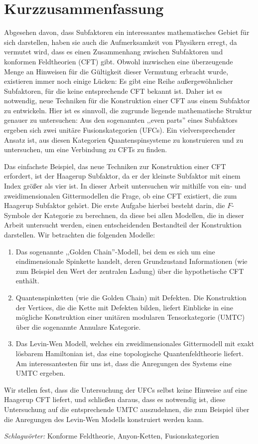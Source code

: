\chapter*{Kurzzusammenfassung}



Abgesehen davon, dass Subfaktoren ein interessantes mathematisches Gebiet für sich darstellen, haben sie auch die Aufmerksamkeit von Physikern erregt, da vermutet wird, dass es einen Zusammenhang zwischen Subfaktoren und konformen Feldtheorien (CFT) gibt. Obwohl inzwischen eine überzeugende Menge an Hinweisen für die Gültigkeit dieser Vermutung erbracht wurde, existieren immer noch einige Lücken: Es gibt eine Reihe außergewöhnlicher Subfaktoren, für die keine entsprechende CFT bekannt ist. Daher ist es notwendig, neue Techniken für die Konstruktion einer CFT aus einem Subfaktor zu entwickeln. Hier ist es sinnvoll, die zugrunde liegende mathematische Struktur genauer zu untersuchen: Aus den sogenannten ,,even parts'' eines Subfaktors ergeben sich zwei unitäre Fusionskategorien (UFCs). Ein vielversprechender Ansatz ist, aus diesen Kategorien Quantenspinsysteme zu konstruieren und zu untersuchen, um eine Verbindung zu CFTs zu finden.

Das einfachste Beispiel, das neue Techniken zur Konstruktion einer CFT erfordert, ist der Haagerup Subfaktor, da er der kleinste Subfaktor mit einem Index größer als vier ist. In dieser Arbeit untersuchen wir mithilfe von ein- und zweidimensionalen Gittermodellen die Frage, ob eine CFT existiert, die zum Haagerup Subfaktor gehört. Die erste Aufgabe hierbei besteht darin, die $F$-Symbole der Kategorie zu berechnen, da diese bei allen Modellen, die in dieser Arbeit untersucht werden, einen entscheidenden Bestandteil der Konstruktion darstellen. Wir betrachten die folgenden Modelle:
	\begin{enumerate}
		\item Das sogenannte ,,Golden Chain''-Modell, bei dem es sich um eine eindimensionale Spinkette handelt, deren Grundzustand Informationen (wie zum Beispiel den Wert der zentralen Ladung) über die hypothetische CFT enthält.
		\item Quantenspinketten (wie die Golden Chain) mit Defekten. Die Konstruktion der Vertices, die die Kette mit Defekten bilden, liefert Einblicke in eine mögliche Konstruktion einer unitären modularen Tensorkategorie (UMTC) über die sogenannte Annulare Kategorie.
		\item Das Levin-Wen Modell, welches ein zweidimensionales Gittermodell mit exakt lösbarem Hamiltonian ist, das eine topologische Quantenfeldtheorie liefert. Am interessantesten für uns ist, dass die Anregungen des Systems eine UMTC ergeben.
	\end{enumerate}

Wir stellen fest, dass die Untersuchung der UFCs selbst keine Hinweise auf eine Haagerup CFT liefert, und schließen daraus, dass es notwendig ist, diese Untersuchung auf die entsprechende UMTC auszudehnen, die zum Beispiel über die Anregungen des Levin-Wen Modells konstruiert werden kann.


\hspace{10pt}

\noindent
\textit{Schlagwörter:} Konforme Feldtheorie, Anyon-Ketten, Fusionskategorien
